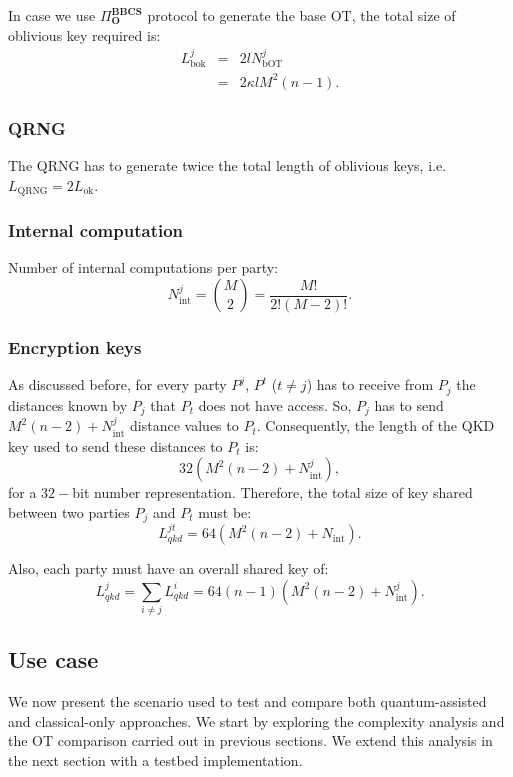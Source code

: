 In case we use $\Pi^{\textbf{BBCS}}_{\textbf{O}}$ protocol to generate the base OT, the total size of oblivious key required is:
\begin{eqnarray*}
L^j_{\text{bok}} &=& 2l N_{\text{bOT}}^j \\
&=& 2\kappa lM^2(n-1).
\end{eqnarray*}


\subsubsection{QRNG}
The QRNG has to generate twice the total length of oblivious keys, i.e. $L_{\text{QRNG}} = 2L_\text{ok}$.

\subsubsection{Internal computation}
Number of internal computations per party:
$$N_\text{int}^j = \binom{M}{2} = \frac{M!}{2!(M-2)!}.$$

\subsubsection{Encryption keys}
As discussed before, for every party $P^j$, $P^t$ ($t\neq j$) has to receive from $P_j$ the distances known by $P_j$ that $P_t$ does not have access. So, $P_j$ has to send $M^2(n-2) + N_\text{int}^j$ distance values to $P_t$. Consequently, the length of the QKD key used to send these distances to $P_t$ is:
$$32(M^2(n-2) + N^j_\text{int}),$$
for a $32-$bit number representation. Therefore, the total size of key shared between two parties $P_j$ and $P_t$ must be:
$$L^{jt}_{qkd} = 64(M^2(n-2) + N_\text{int}).$$

Also, each party must have an overall shared key of: $$L^{j}_{qkd} = \sum_{i\neq j} L^{i}_{qkd} = 64(n-1)(M^2(n-2) + N^j_\text{int}).$$



\subsection{Use case}\label{useCase}

We now present the scenario used to test and compare both quantum-assisted and classical-only approaches. We start by exploring the complexity analysis and the OT comparison carried out in previous sections. We extend this analysis in the next section with a testbed implementation. 

